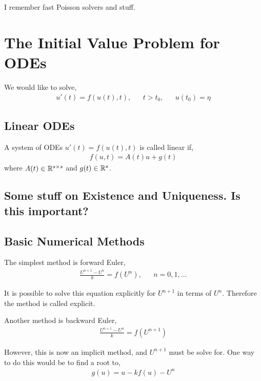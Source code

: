 \documentclass[12pt]{article}
\begin{document}
I remember fast Poisson solvers and stuff.

{}


\section{The Initial Value Problem for ODEs}

We would like to solve,
\begin{align*}
    u'(t) = f(u(t),t), && t>t_0, && u(t_0) = \eta
\end{align*}

\subsection{Linear ODEs}

\begin{definition}
A system of ODEs \( u'(t) = f(u(t),t) \) is called linear if,
\begin{align*}
    f(u,t) = A(t) u + g(t)
\end{align*}
where \( A(t) \in \mathbb{R}^{s\times s} \) and \( g(t)\in\mathbb{R}^s \).
\end{definition}

\subsection{Some stuff on Existence and Uniqueness. Is this important?}


\subsection{Basic Numerical Methods}

The simplest method is forward Euler,
\begin{align*}
    \frac{U^{n+1}-U^n}{k} = f(U^n), && n=0,1,\ldots
\end{align*}

It is possible to solve this equation explicitly for \( U^{n+1} \) in terms of \( U^n \). Therefore the method is called explicit.

Another method is backward Euler,
\begin{align*}
    \frac{U^{n+1}-U^n}{k} = f(U^{n+1})
\end{align*}

However, this is now an implicit method, and \( U^{n+1} \) must be solve for. One way to do this would be to find a root to,
\begin{align*}
    g(u) = u - k f(u ) - U^n
\end{align*}
\end{document}
